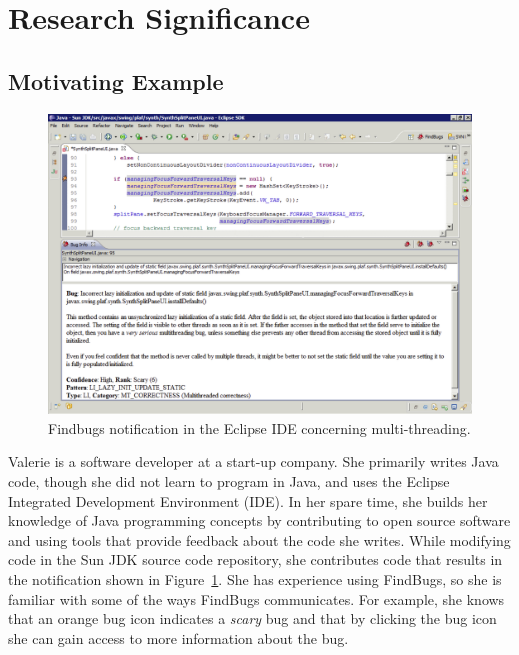 \documentclass{llncs}
\begin{document}
\section{Research Significance}

\subsection*{Motivating Example}

\begin{figure} [ht]
	\centering
	\includegraphics[width=\textwidth]{figs/eclipse.png}
	\caption{Findbugs notification in the Eclipse IDE concerning multi-threading.}
	\label{fig:eclipse}
\end{figure} 

Valerie is a software developer at a start-up company. She primarily writes Java code, though she did not learn to program in Java, and uses the Eclipse Integrated Development Environment (IDE). In her spare time, she builds her knowledge of Java programming concepts by contributing to open source software and using tools that provide feedback about the code she writes. While modifying code in the Sun JDK source code repository, she contributes code that results in the notification shown in Figure~\ref{fig:eclipse}. She has experience using FindBugs, so she is familiar with some of the ways FindBugs communicates. For example, she knows that an orange bug icon indicates a \textit{scary} bug and that by clicking the bug icon she can gain access to more information about the bug.
\end{document}
